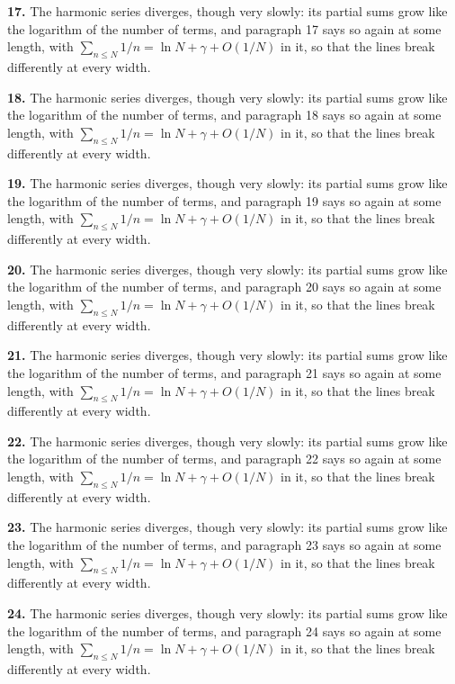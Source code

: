 \noindent\textbf{17.} The harmonic series diverges, though very slowly: its partial sums
grow like the logarithm of the number of terms, and paragraph 17 says so again
at some length, with $\sum_{n \le N} 1/n = \ln N + \gamma + O(1/N)$ in it,
so that the lines break differently at every width.

\noindent\textbf{18.} The harmonic series diverges, though very slowly: its partial sums
grow like the logarithm of the number of terms, and paragraph 18 says so again
at some length, with $\sum_{n \le N} 1/n = \ln N + \gamma + O(1/N)$ in it,
so that the lines break differently at every width.

\noindent\textbf{19.} The harmonic series diverges, though very slowly: its partial sums
grow like the logarithm of the number of terms, and paragraph 19 says so again
at some length, with $\sum_{n \le N} 1/n = \ln N + \gamma + O(1/N)$ in it,
so that the lines break differently at every width.

\noindent\textbf{20.} The harmonic series diverges, though very slowly: its partial sums
grow like the logarithm of the number of terms, and paragraph 20 says so again
at some length, with $\sum_{n \le N} 1/n = \ln N + \gamma + O(1/N)$ in it,
so that the lines break differently at every width.

\noindent\textbf{21.} The harmonic series diverges, though very slowly: its partial sums
grow like the logarithm of the number of terms, and paragraph 21 says so again
at some length, with $\sum_{n \le N} 1/n = \ln N + \gamma + O(1/N)$ in it,
so that the lines break differently at every width.

\noindent\textbf{22.} The harmonic series diverges, though very slowly: its partial sums
grow like the logarithm of the number of terms, and paragraph 22 says so again
at some length, with $\sum_{n \le N} 1/n = \ln N + \gamma + O(1/N)$ in it,
so that the lines break differently at every width.

\noindent\textbf{23.} The harmonic series diverges, though very slowly: its partial sums
grow like the logarithm of the number of terms, and paragraph 23 says so again
at some length, with $\sum_{n \le N} 1/n = \ln N + \gamma + O(1/N)$ in it,
so that the lines break differently at every width.

\noindent\textbf{24.} The harmonic series diverges, though very slowly: its partial sums
grow like the logarithm of the number of terms, and paragraph 24 says so again
at some length, with $\sum_{n \le N} 1/n = \ln N + \gamma + O(1/N)$ in it,
so that the lines break differently at every width.


